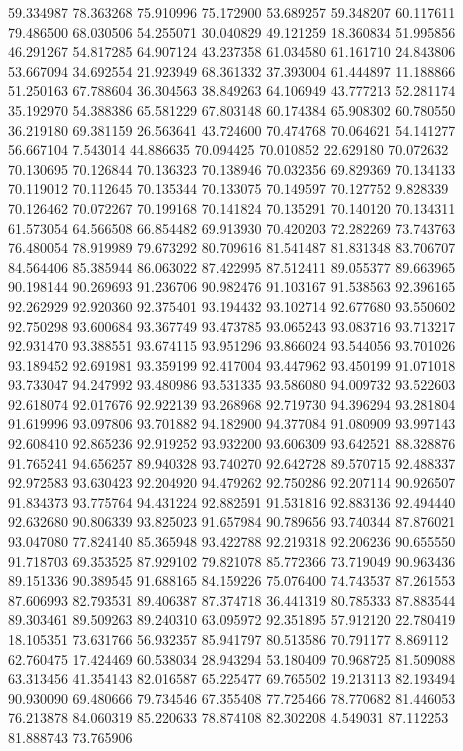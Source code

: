 59.334987
78.363268
75.910996
75.172900
53.689257
59.348207
60.117611
79.486500
68.030506
54.255071
30.040829
49.121259
18.360834
51.995856
46.291267
54.817285
64.907124
43.237358
61.034580
61.161710
24.843806
53.667094
34.692554
21.923949
68.361332
37.393004
61.444897
11.188866
51.250163
67.788604
36.304563
38.849263
64.106949
43.777213
52.281174
35.192970
54.388386
65.581229
67.803148
60.174384
65.908302
60.780550
36.219180
69.381159
26.563641
43.724600
70.474768
70.064621
54.141277
56.667104
7.543014
44.886635
70.094425
70.010852
22.629180
70.072632
70.130695
70.126844
70.136323
70.138946
70.032356
69.829369
70.134133
70.119012
70.112645
70.135344
70.133075
70.149597
70.127752
9.828339
70.126462
70.072267
70.199168
70.141824
70.135291
70.140120
70.134311
61.573054
64.566508
66.854482
69.913930
70.420203
72.282269
73.743763
76.480054
78.919989
79.673292
80.709616
81.541487
81.831348
83.706707
84.564406
85.385944
86.063022
87.422995
87.512411
89.055377
89.663965
90.198144
90.269693
91.236706
90.982476
91.103167
91.538563
92.396165
92.262929
92.920360
92.375401
93.194432
93.102714
92.677680
93.550602
92.750298
93.600684
93.367749
93.473785
93.065243
93.083716
93.713217
92.931470
93.388551
93.674115
93.951296
93.866024
93.544056
93.701026
93.189452
92.691981
93.359199
92.417004
93.447962
93.450199
91.071018
93.733047
94.247992
93.480986
93.531335
93.586080
94.009732
93.522603
92.618074
92.017676
92.922139
93.268968
92.719730
94.396294
93.281804
91.619996
93.097806
93.701882
94.182900
94.377084
91.080909
93.997143
92.608410
92.865236
92.919252
93.932200
93.606309
93.642521
88.328876
91.765241
94.656257
89.940328
93.740270
92.642728
89.570715
92.488337
92.972583
93.630423
92.204920
94.479262
92.750286
92.207114
90.926507
91.834373
93.775764
94.431224
92.882591
91.531816
92.883136
92.494440
92.632680
90.806339
93.825023
91.657984
90.789656
93.740344
87.876021
93.047080
77.824140
85.365948
93.422788
92.219318
92.206236
90.655550
91.718703
69.353525
87.929102
79.821078
85.772366
73.719049
90.963436
89.151336
90.389545
91.688165
84.159226
75.076400
74.743537
87.261553
87.606993
82.793531
89.406387
87.374718
36.441319
80.785333
87.883544
89.303461
89.509263
89.240310
63.095972
92.351895
57.912120
22.780419
18.105351
73.631766
56.932357
85.941797
80.513586
70.791177
8.869112
62.760475
17.424469
60.538034
28.943294
53.180409
70.968725
81.509088
63.313456
41.354143
82.016587
65.225477
69.765502
19.213113
82.193494
90.930090
69.480666
79.734546
67.355408
77.725466
78.770682
81.446053
76.213878
84.060319
85.220633
78.874108
82.302208
4.549031
87.112253
81.888743
73.765906
